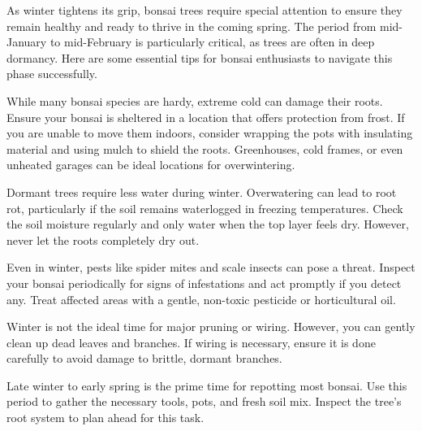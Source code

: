 
\label{2025-01-care}

As winter tightens its grip, bonsai trees require special attention to ensure they remain healthy and ready to thrive in the coming spring. The period from mid-January to mid-February is particularly critical, as trees are often in deep dormancy. Here are some essential tips for bonsai enthusiasts to navigate this phase successfully.

\medskip

\noindent
While many bonsai species are hardy, extreme cold can damage their roots. Ensure your bonsai is sheltered in a location that offers protection from frost. If you are unable to move them indoors, consider wrapping the pots with insulating material and using mulch to shield the roots. Greenhouses, cold frames, or even unheated garages can be ideal locations for overwintering.

\medskip

\noindent
Dormant trees require less water during winter. Overwatering can lead to root rot, particularly if the soil remains waterlogged in freezing temperatures. Check the soil moisture regularly and only water when the top layer feels dry. However, never let the roots completely dry out.

\medskip

\noindent
Even in winter, pests like spider mites and scale insects can pose a threat. Inspect your bonsai periodically for signs of infestations and act promptly if you detect any. Treat affected areas with a gentle, non-toxic pesticide or horticultural oil.

\medskip

\noindent
Winter is not the ideal time for major pruning or wiring. However, you can gently clean up dead leaves and branches. If wiring is necessary, ensure it is done carefully to avoid damage to brittle, dormant branches.

\medskip

\noindent
Late winter to early spring is the prime time for repotting most bonsai. Use this period to gather the necessary tools, pots, and fresh soil mix. Inspect the tree's root system to plan ahead for this task.

